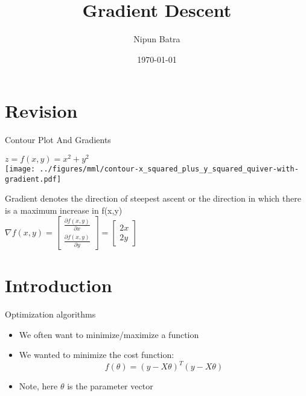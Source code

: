 \documentclass[usenames,dvipsnames]{beamer}
\title{Gradient Descent}
\date{\today}
\author{Nipun Batra}
\institute{IIT Gandhinagar}
\begin{document}
  \maketitle

  \section{Revision}
  \begin{frame}{Contour Plot And Gradients}
	
	$z = f(x,y) = x^{2} + y^{2}$\\
	
	\texttt{[image: ../figures/mml/contour-x\_squared\_plus\_y\_squared\_quiver-with-gradient.pdf]}
	
	


\pause Gradient denotes the direction of steepest ascent or the direction in which there is a maximum increase in f(x,y) \\
\pause $\nabla f(x, y) = \begin{bmatrix}
\frac{\partial f(x, y)}{\partial x}\\
\frac{\partial f(x, y)}{\partial y}
\end{bmatrix} = \begin{bmatrix} 2x\\2y
\end{bmatrix}$



\end{frame}

  \section{Introduction}

  \begin{frame}{Optimization algorithms}
    \begin{itemize}[<+->]
        \item We often want to minimize/maximize a function
        \item We wanted to minimize the cost function:
        \begin{equation}
            f(\theta) = (y-X\theta)^T(y-X\theta)
        \end{equation}
        \item Note, here $\theta$ is the parameter vector
        \end{itemize}   
  \end{frame}
\end{document}
